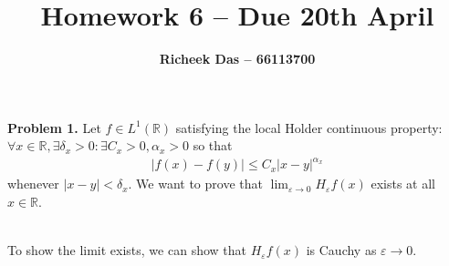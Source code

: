 \documentclass{article}
\title{Homework 6 --  Due 20th April}
\author{\textbf{Richeek Das -- 66113700}}
\newcommand{\R}{\mathbb{R}}
\begin{document}
\maketitle

\textbf{Problem 1. } Let $f \in L^1(\R)$ satisfying the local Holder continuous property: $\forall x \in \R, \exists \delta_x > 0: \exists C_x > 0, \alpha_x >0$ so that
\begin{gather*}
    |f(x) - f(y)| \leq  C_x |x-y|^{\alpha_x}
\end{gather*}
whenever $|x-y| < \delta_x$. We want to prove that $\lim_{\varepsilon \to 0} H_{\varepsilon}f(x)$ exists at all $x \in \R$.
\\~

To show the limit exists, we can show that $H_{\varepsilon}f(x)$ is Cauchy as $\varepsilon \to 0$.
\\~
\end{document}
